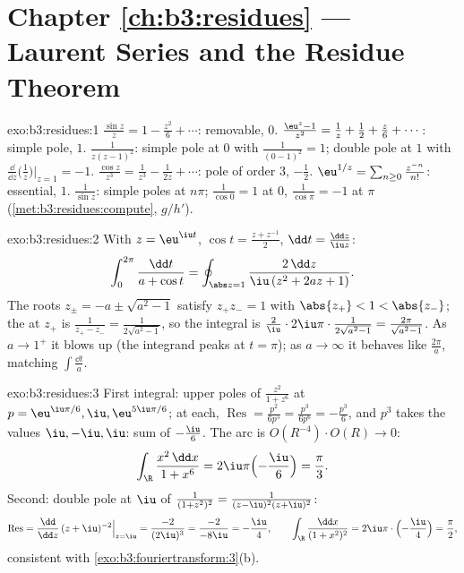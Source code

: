 \section*{Chapter \ref{ch:b3:residues} --- Laurent Series and
the Residue Theorem}

\begin{solution}{exo:b3:residues:1}
$\frac{\sin z}z = 1 - \frac{z^2}6 + \cdots$: removable,
 $0$. $\frac{\eu^z - 1}{z^2} = \frac1z + \frac12 +
\frac z6 + \cdots$: simple pole,  $1$.
$\frac1{z(z-1)^2}$: simple pole at $0$ with 
$\frac1{(0-1)^2} = 1$; double pole at $1$ with 
$\frac{\dd}{\dd z}\bigl(\frac1z\bigr)\big|_{z=1} = -1$.
$\frac{\cos z}{z^3} = \frac1{z^3} - \frac1{2z} + \cdots$: pole
of order $3$,  $-\frac12$. $\eu^{1/z} = \sum_{n\geq0}
\frac{z^{-n}}{n!}$: essential,  $1$. $\frac1{\sin z}$:
simple poles at $n\pi$;  $\frac1{\cos 0} = 1$ at $0$,
$\frac1{\cos\pi} = -1$ at $\pi$
(\cref{met:b3:residues:compute}, $g/h'$).
\end{solution}

\begin{solution}{exo:b3:residues:2}
With $z = \eu^{\iu t}$, $\cos t = \frac{z + z^{-1}}2$, $\dd t
= \frac{\dd z}{\iu z}$:
\[
\int_0^{2\pi}\frac{\dd t}{a + \cos t}
= \oint_{\abs z = 1}\frac{2\,\dd z}{\iu\,(z^2 + 2az + 1)} .
\]
The roots $z_\pm = -a \pm \sqrt{a^2 - 1}$ satisfy $z_+z_- =
1$ with $\abs{z_+} < 1 < \abs{z_-}$; the  at $z_+$ is
$\frac{1}{z_+ - z_-} = \frac1{2\sqrt{a^2-1}}$, so the integral
is $\frac2\iu\cdot2\iu\pi\cdot\frac1{2\sqrt{a^2-1}} =
\frac{2\pi}{\sqrt{a^2-1}}$. As $a \to 1^+$ it blows up (the
integrand peaks at $t = \pi$); as $a \to \infty$ it behaves
like $\frac{2\pi}a$, matching $\int\frac{\dd t}a$.
\end{solution}

\begin{solution}{exo:b3:residues:3}
First integral: upper poles of $\frac{z^2}{1+z^6}$ at $p =
\eu^{\iu\pi/6}, \iu, \eu^{5\iu\pi/6}$; at each,
$\operatorname{Res} = \frac{p^2}{6p^5} = \frac{p^3}{6p^6} =
-\frac{p^3}6$, and $p^3$ takes the values $\iu, -\iu, \iu$:
sum of  $-\frac{\iu}{6}$. The arc is
$O(R^{-4})\cdot O(R) \to 0$:
\[
\int_\R\frac{x^2\,\dd x}{1 + x^6} =
2\iu\pi\Bigl(-\frac \iu6\Bigr) = \frac\pi3 .
\]
Second: double pole at $\iu$ of $\frac1{(1+z^2)^2} =
\frac1{(z-\iu)^2(z+\iu)^2}$:
\[
\operatorname{Res} = \frac{\dd}{\dd z}\,(z +
\iu)^{-2}\Big|_{z=\iu} = \frac{-2}{(2\iu)^3} =
\frac{-2}{-8\iu} = -\frac\iu4,
\qquad
\int_\R\frac{\dd x}{(1+x^2)^2} =
2\iu\pi\cdot\Bigl(-\frac\iu4\Bigr) = \frac\pi2 ,
\]
consistent with \cref{exo:b3:fouriertransform:3}(b).
\end{solution}

